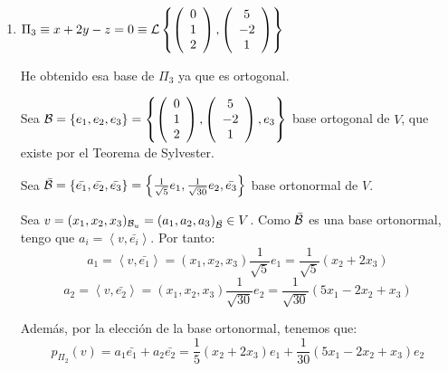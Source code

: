 \begin{ejercicio}
\begin{enumerate}
\begin{enumerate}
        \item $\Pi_3\equiv x+2y-z=0 \equiv \mathcal{L}\left\{\left(\begin{array}{c}
             0 \\ 1 \\ 2
        \end{array}\right),
        \left(\begin{array}{c}
             5 \\ -2 \\ 1
        \end{array}\right)\right\}$

        He obtenido esa base de $\Pi_3$ ya que es ortogonal.

        Sea $\mathcal{B}=\{e_1, e_2, e_3\}=\left\{
                \left(\begin{array}{c}
                     0 \\ 1 \\ 2
                \end{array}\right),
                \left(\begin{array}{c}
                     5 \\ -2 \\ 1
                \end{array}\right),
                e_3\right\}$
        base ortogonal de $V$, que existe por el Teorema de Sylvester.
        
        Sea $\bar{\mathcal{B}}=\{\bar{e_1}, \bar{e_2}, \bar{e_3}\}= \left\{
            \frac{1}{\sqrt{5}}e_1,
            \frac{1}{\sqrt{30}}e_2, \bar{e_3}
            \right\}$ base ortonormal de $V$.
        
        Sea $v=(x_1, x_2, x_3)_{\mathcal{B}_u}=(a_1, a_2, a_3)_{\bar{\mathcal{B}}}\in V$. Como $\bar{\mathcal{B}}$ es una base ortonormal, tengo que $a_i = \left<v, \bar{e_i}\right>$. Por tanto:
        \begin{equation*}
            a_1 = \left<v, \bar{e_1}\right> = (x_1, x_2, x_3) \frac{1}{\sqrt{5}}e_1
            = \frac{1}{\sqrt{5}}(x_2+2x_3)
        \end{equation*}
        \begin{equation*}
            a_2 = \left<v, \bar{e_2}\right> = (x_1, x_2, x_3) \frac{1}{\sqrt{30}} e_2
            = \frac{1}{\sqrt{30}}(5x_1-2x_2+x_3)
        \end{equation*}
        
        Además, por la elección de la base ortonormal, tenemos que:
        \begin{equation*}
            p_{\Pi_2}(v)=a_1\bar{e_1} +a_2\bar{e_2}
            = \frac{1}{5}(x_2+2x_3)e_1 +\frac{1}{30}(5x_1-2x_2+x_3)e_2
        \end{equation*}


\end{enumerate}
\end{enumerate}
\end{ejercicio}

